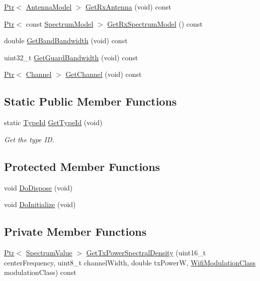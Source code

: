 \begin{DoxyCompactItemize}
\item 
\hyperlink{classns3_1_1Ptr}{Ptr}$<$ \hyperlink{classns3_1_1AntennaModel}{Antenna\+Model} $>$ \hyperlink{classns3_1_1SpectrumWifiPhy_ac4f0e5f8325b8183eb5ba244fdb59609}{Get\+Rx\+Antenna} (void) const 
\item 
\hyperlink{classns3_1_1Ptr}{Ptr}$<$ const \hyperlink{classns3_1_1SpectrumModel}{Spectrum\+Model} $>$ \hyperlink{classns3_1_1SpectrumWifiPhy_a97be1277207ea9f9361fb90a4d0e7e4f}{Get\+Rx\+Spectrum\+Model} () const 
\item 
double \hyperlink{classns3_1_1SpectrumWifiPhy_a2028d03c5fa0c7683ea23c6ada450d84}{Get\+Band\+Bandwidth} (void) const 
\item 
uint32\+\_\+t \hyperlink{classns3_1_1SpectrumWifiPhy_a5a24b5d646d3968cf4678a814156edfe}{Get\+Guard\+Bandwidth} (void) const 
\item 
\hyperlink{classns3_1_1Ptr}{Ptr}$<$ \hyperlink{classns3_1_1Channel}{Channel} $>$ \hyperlink{classns3_1_1SpectrumWifiPhy_abbd2eb373e160f13ccdd4c46cffdda9d}{Get\+Channel} (void) const 
\end{DoxyCompactItemize}
\subsection*{Static Public Member Functions}
\begin{DoxyCompactItemize}
\item 
static \hyperlink{classns3_1_1TypeId}{Type\+Id} \hyperlink{classns3_1_1SpectrumWifiPhy_ab5d9c31f2c818da445b72959f18ed5a4}{Get\+Type\+Id} (void)
\begin{DoxyCompactList}\small\item\em Get the type ID. \end{DoxyCompactList}\end{DoxyCompactItemize}
\subsection*{Protected Member Functions}
\begin{DoxyCompactItemize}
\item 
void \hyperlink{classns3_1_1SpectrumWifiPhy_a76f043f6339742355a5e053496a414f6}{Do\+Dispose} (void)
\item 
void \hyperlink{classns3_1_1SpectrumWifiPhy_ab421902e520fa6430d8ca2c64c00878c}{Do\+Initialize} (void)
\end{DoxyCompactItemize}
\subsection*{Private Member Functions}
\begin{DoxyCompactItemize}
\item 
\hyperlink{classns3_1_1Ptr}{Ptr}$<$ \hyperlink{classns3_1_1SpectrumValue}{Spectrum\+Value} $>$ \hyperlink{classns3_1_1SpectrumWifiPhy_a36d579959efb946f0ebb3725c3b9ae47}{Get\+Tx\+Power\+Spectral\+Density} (uint16\+\_\+t center\+Frequency, uint8\+\_\+t channel\+Width, double tx\+PowerW, \hyperlink{namespacens3_aa999e1221606a2b21b1eb33c2007c217}{Wifi\+Modulation\+Class} modulation\+Class) const 
\end{DoxyCompactItemize}
